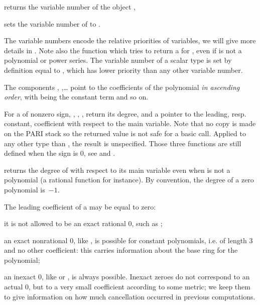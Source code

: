  returns the variable number of the object ,

 sets the variable number of  to
.

The variable numbers encode the relative priorities of variables, we will
give more details in . Note also the function
 which tries to return a  for
, even if  is not a polynomial or power series. The variable
number of a scalar type is set by definition equal to ,
which has lower priority than any other variable number.

The components , ,\dots {} point to the
coefficients of the polynomial \emph{in ascending order}, with 
being the constant term and so on.

For a  of nonzero sign, , ,
, return its degree, and a pointer to the leading,
resp. constant, coefficient with respect to the main variable. Note that no
copy is made on the PARI stack so the returned value is not safe for a basic
 call. Applied to any other type than , the result is
unspecified. Those three functions are still defined when the sign is $0$,
see  and .

 returns the degree of  with respect to its
main variable even when  is not a polynomial (a rational function for
instance). By convention, the degree of a zero polynomial is~$-1$.

The leading coefficient of a  may be equal to zero:

\item it is not allowed to be an exact rational $0$, such as ;

\item an exact nonrational $0$, like , is possible for
constant polynomials, i.e. of length $3$ and no other coefficient: this
carries information about the base ring for the polynomial;

\item an inexact $0$, like  or , is always
possible. Inexact zeroes do not correspond to an actual $0$, but to a
very small coefficient according to some metric; we keep them to give
information on how much cancellation occurred in previous computations.

